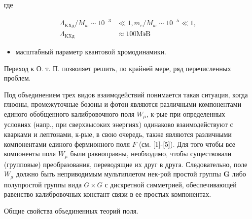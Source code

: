 \documentclass[10pt]{article}
\begin{document}
где



\[

\begin{aligned}

\Lambda_{\mathrm{KХд}} / M_{w} \sim 10^{-3} & \ll 1, m_{e} / M_{w} \sim 10^{-5} \ll 1, \\

\Lambda_{\mathrm{KXд}} & \approx 100 \mathrm{MэB}

\end{aligned}

\]



\begin{itemize}

  \item масштабный параметр квантовой хромодинамики.

\end{itemize}



Переход к О. т. П. позволяет решить, по крайней мере, ряд перечисленных проблем.



Под объединением трех видов взаимодействий понимается такая ситуация, когда глюоны, промежуточные бозоны и фотон являются различными компонентами единого обобщенного калибровочного поля $W_{\mu}$, к-рые при определенных условиях (напр., при сверхвысоких энергиях) одинаково взаимодействуют с кварками и лептонами, к-рые, в свою очередь, также являются различными компонентами единого фермионного поля $F$ (см. [1]-[5]). Для того чтобы все компоненты поля $W_{\mu}$ были равноправны, необходимо, чтобы существовали (групповые) преобразования, переводящие их друг в друга. Следовательно, поле $W_{\mu}$ должно быть неприводимым мультиплетом нек-рой простой группы $\boldsymbol{G}$ либо полупростой группы вида $G \times G$ с дискретной симметрией, обеспечивающей равенство калибровочных констант связи в ее простых компонентах.



Общие свойства объединенных теорий поля.
\end{document}
